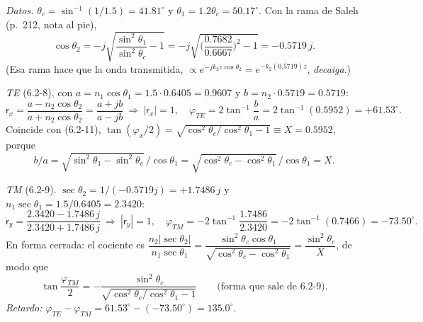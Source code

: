  \emph{Datos.} $\theta_c=\sin^{-1}(1/1.5)=41.81^\circ$ y $\theta_1=1.2\theta_c=50.17^\circ$. Con la rama de
Saleh (p.~212, nota al pie),
\[
\cos\theta_2=-j\sqrt{\frac{\sin^2\theta_1}{\sin^2\theta_c}-1}=-j\sqrt{\Big(\frac{0.7682}{0.6667}\Big)^2-1}=-0.5719\,j .
\]
(Esa rama hace que la onda transmitida, $\propto e^{-jk_2z\cos\theta_2}=e^{-k_2(0.5719)z}$, \emph{decaiga}.)

\emph{TE} (6.2-8), con $a=n_1\cos\theta_1=1.5\cdot0.6405=0.9607$ y $b=n_2\cdot0.5719=0.5719$:
\[
\mathsf r_x=\frac{a-n_2\cos\theta_2}{a+n_2\cos\theta_2}=\frac{a+jb}{a-jb}\ \Rightarrow\ |\mathsf r_x|=1,\quad
\varphi_{TE}=2\tan^{-1}\frac{b}{a}=2\tan^{-1}(0.5952)=+61.53^\circ .
\]
Coincide con (6.2-11), $\tan(\varphi_x/2)=\sqrt{\cos^2\theta_c/\cos^2\theta_1-1}\equiv X=0.5952$, porque
\[
b/a=\sqrt{\sin^2\theta_1-\sin^2\theta_c}\,/\cos\theta_1=\sqrt{\cos^2\theta_c-\cos^2\theta_1}\,/\cos\theta_1=X .
\]

\emph{TM} (6.2-9). $\sec\theta_2=1/(-0.5719j)=+1.7486\,j$ y $n_1\sec\theta_1=1.5/0.6405=2.3420$:
\[
\mathsf r_y=\frac{2.3420-1.7486\,j}{2.3420+1.7486\,j}\ \Rightarrow\ |\mathsf r_y|=1,\quad
\varphi_{TM}=-2\tan^{-1}\frac{1.7486}{2.3420}=-2\tan^{-1}(0.7466)=-73.50^\circ .
\]
En forma cerrada: el cociente es $\dfrac{n_2|\sec\theta_2|}{n_1\sec\theta_1}=\dfrac{\sin^2\theta_c\cos\theta_1}{\sqrt{\cos^2\theta_c-\cos^2\theta_1}}=\dfrac{\sin^2\theta_c}{X}$, de modo que
\begin{equation}
\tan\frac{\varphi_{TM}}{2}=-\frac{\sin^2\theta_c}{\sqrt{\cos^2\theta_c/\cos^2\theta_1-1}}\qquad\text{(forma que sale de 6.2-9)}.
\label{eq:t3_tm}
\end{equation}
\emph{Retardo:} $\varphi_{TE}-\varphi_{TM}=61.53^\circ-(-73.50^\circ)=135.0^\circ$.

